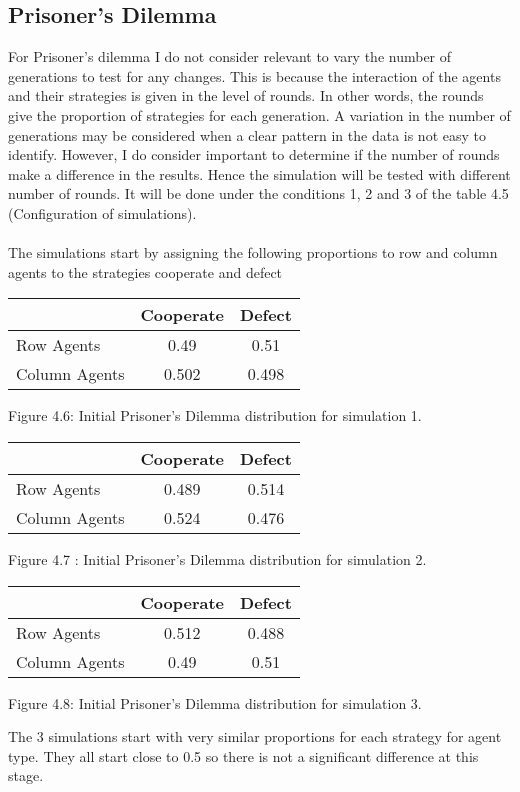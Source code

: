\documentclass{article}
\begin{document}
\subsection{Prisoner's Dilemma}
For Prisoner's dilemma I do not consider relevant to vary the number of generations to test for any changes. This is because the interaction of the agents and their strategies is given in the level of rounds. In other words, the rounds give the proportion of strategies for each generation. A variation in the number of generations may be considered when a clear pattern in the data is not easy to identify. However, I do consider important to determine if the number of rounds make a difference in the results. Hence the simulation will be tested  with different number of rounds. It will be done under the conditions 1, 2 and 3 of the table 4.5 (Configuration of simulations).
\\\\The simulations start by assigning the following proportions to row and column agents to the strategies cooperate and defect
\begin{center}
\begin{tabular}{|l|c|c|}
\hline
& Cooperate & Defect \\ 
\hline
Row Agents & 0.49 & 0.51\\
\hline
Column Agents & 0.502 & 0.498\\
\hline
\end{tabular}
\end{center}
\begin{center}
Figure 4.6: Initial Prisoner’s Dilemma distribution for simulation 1.
\end{center}

\begin{center}
\begin{tabular}{|l|c|c|}
\hline
& Cooperate & Defect \\ 
\hline
Row Agents & 0.489 & 0.514\\
\hline
Column Agents & 0.524 & 0.476\\
\hline
\end{tabular}
\end{center}
\begin{center}
Figure 4.7 : Initial Prisoner’s Dilemma distribution for simulation 2.
\end{center}

\begin{center}
\begin{tabular}{|l|c|c|}
\hline
& Cooperate & Defect \\ 
\hline
Row Agents & 0.512 & 0.488\\
\hline
Column Agents & 0.49 & 0.51\\
\hline
\end{tabular}
\end{center}
\begin{center}
Figure 4.8: Initial Prisoner’s Dilemma distribution for simulation 3.
\end{center}
 The 3 simulations start with very similar proportions for each strategy for agent type. They all start close to 0.5 so there is not a significant difference at this stage.
\end{document}
